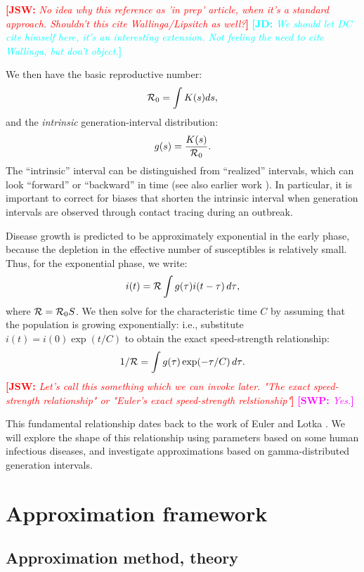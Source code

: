 \documentclass[12pt]{article}
\newcommand{\RR}{\ensuremath{{\cal R}}}
\newcommand{\Rx}[1]{\ensuremath{{\cal R}_{#1}}}
\newcommand{\Ro}{\Rx{0}}
\newcommand{\Tc}{\ensuremath{C}}
\newcommand{\comment}[3]{\textcolor{#1}{\textbf{[#2: }\textit{#3}\textbf{]}}}
\newcommand{\jd}[1]{\comment{cyan}{JD}{#1}}
\newcommand{\swp}[1]{\comment{magenta}{SWP}{#1}}
\newcommand{\jsw}[1]{\comment{red}{JSW}{#1}}
\begin{document}
\jsw{No idea why this reference as 'in prep' article, when it's a standard approach. Shouldn't this cite Wallinga/Lipsitch as well?}
\jd{We should let DC cite himself here, it's an interesting extension. Not feeling the need to cite Wallinga, but don't object.}

We then have the basic reproductive number: 
\begin{equation}
\Ro = \int{K(s)ds},
\end{equation}
and the \emph{intrinsic} generation-interval distribution:
\begin{equation}
g(s) = \frac{K(s)}{\Ro}.
\end{equation}
The ``intrinsic'' interval can be distinguished from ``realized'' intervals, which can look ``forward'' or ``backward'' in time \cite{ChamDush15} (see also earlier work \cite{Sven07,Nish10}). In particular, it is important to correct for biases that shorten the intrinsic interval when generation intervals are observed through contact tracing during an outbreak.

Disease growth is predicted to be approximately exponential in the early phase, because the depletion in the effective number of susceptibles is relatively small.
Thus, for the exponential phase, we write:
\begin{equation}
i(t) = \RR\int{g(\tau)i(t-\tau) \,d\tau},
\end{equation}
where $\RR = \Ro S$.
We then solve for the characteristic time $\Tc$ by assuming that the population is growing exponentially: i.e., substitute $i(t) = i(0) \exp(t/\Tc)$ to obtain the exact speed-strength relationship:
\begin{equation}
	1/\RR = \int{g(\tau)\exp(-\tau/\Tc) \,d\tau}.\label{eq:Euler}
\end{equation}
\jsw{Let's call this something which we can invoke later. "The exact speed-strength relationship" or "Euler's exact speed-strength relstionship"}
\swp{Yes.}

This fundamental relationship dates back to the work of Euler and Lotka \cite{Euler,Lotka}. We will explore the shape of this relationship using parameters based on some human infectious diseases, and investigate approximations based on gamma-distributed generation intervals.

\section{Approximation framework}

\subsection{Approximation method, theory}
\end{document}
